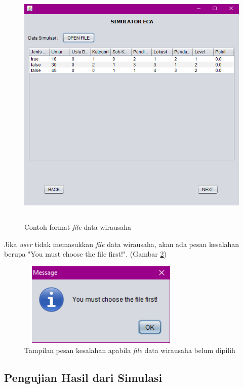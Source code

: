 	\begin{figure} [H]
	\centering  
	\includegraphics[width=12cm, height=12cm]{tampilanData} 
		\caption[Contoh format \textit{file} data wirausaha]{Contoh format \textit{file} data wirausaha}
	\label{tampilanData} 
\end{figure}

Jika \textit{user} tidak memasukkan \textit{file} data wirausaha, akan ada pesan kesalahan berupa "You must choose the file first!". (Gambar \ref{pesanError6})

	\begin{figure} [H]
	\centering  
	\includegraphics[width=8cm, height=4cm]{pesanError6} 
		\caption[Tampilan pesan kesalahan apabila \textit{file} data wirausaha belum dipilih]{Tampilan pesan kesalahan apabila \textit{file} data wirausaha belum dipilih}
	\label{pesanError6} 
\end{figure}

 
\subsection{Pengujian Hasil dari Simulasi}

